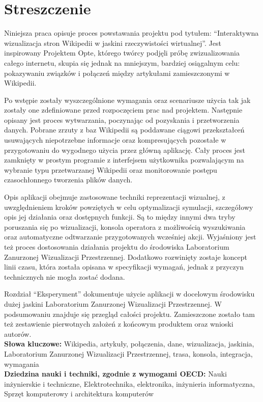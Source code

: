 \chapter*{Streszczenie}
Niniejsza praca opisuje proces powstawania projektu pod tytułem: ``Interaktywna wizualizacja stron Wikipedii w jaskini rzeczywistości wirtualnej''. Jest inspirowany Projektem Opte, którego twórcy podjęli próbę zwizualizowania całego internetu, skupia się jednak na mniejszym, bardziej osiągalnym celu: pokazywaniu związków i połączeń między artykułami zamieszczonymi w Wikipedii. 

Po wstępie zostały wyszczególnione wymagania oraz scenariusze użycia tak jak zostały one zdefiniowane przed rozpoczęciem prac nad projektem. Następnie opisany jest proces wytwarzania, poczynając od pozyskania i przetworzenia danych. Pobrane zrzuty z baz Wikipedii są poddawane ciągowi przekształceń usuwających niepotrzebne informacje oraz kompresujących pozostałe w przygotowaniu do wygodnego użycia przez główną aplikację. Cały proces jest zamknięty w prostym programie z interfejsem użytkownika pozwalającym na wybranie typu przetwarzanej Wikipedii oraz monitorowanie postępu czasochłonnego tworzenia plików danych.

Opis aplikacji obejmuje zastosowane techniki reprezentacji wizualnej, z uwzględnieniem kroków powziętych w celu optymalizacji symulacji, szczegółowy opis jej działania oraz dostępnych funkcji. Są to między innymi dwa tryby poruszania się po wizualizacji, konsola operatora z możliwością wyszukiwania oraz automatyczne odtwarzanie przygotowanych wcześniej akcji. Wyjaśniony jest też proces dostosowania działania projektu do środowiska Laboratorium Zanurzonej Wizualizacji Przestrzennej. Dodatkowo rozwinięty zostaje koncept linii czasu, która została opisana w specyfikacji wymagań, jednak z przyczyn technicznych nie mogła zostać dodana.

Rozdział ``Eksperyment'' dokumentuje użycie aplikacji w docelowym środowisku dużej jaskini Laboratorium Zanurzonej Wizualizacji Przestrzennej. W podsumowaniu znajduje się przegląd całości projektu. Zamieszczone zostało tam też zestawienie pierwotnych założeń z końcowym produktem oraz wnioski autorów.\\

\noindent\textbf{Słowa kluczowe:} Wikipedia, artykuły, połączenia, dane, wizualizacja, jaskinia, Laboratorium Zanurzonej Wizualizacji Przestrzennej, trasa, konsola, integracja, wymagania \\

\noindent\textbf{Dziedzina nauki i techniki, zgodnie z wymogami OECD:} Nauki inżynierskie i techniczne, Elektrotechnika, elektronika, inżynieria informatyczna, Sprzęt komputerowy i architektura komputerów
